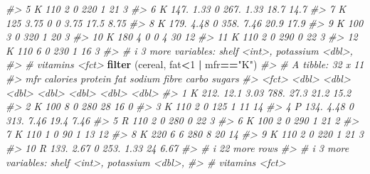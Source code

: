 \documentclass[
]{book}
\newenvironment{Shaded}{\begin{snugshade}}{\end{snugshade}}
\newcommand{\CommentTok}[1]{\textcolor[rgb]{0.56,0.35,0.01}{\textit{#1}}}
\newcommand{\DecValTok}[1]{\textcolor[rgb]{0.00,0.00,0.81}{#1}}
\newcommand{\FunctionTok}[1]{\textcolor[rgb]{0.13,0.29,0.53}{\textbf{#1}}}
\newcommand{\NormalTok}[1]{#1}
\newcommand{\SpecialCharTok}[1]{\textcolor[rgb]{0.81,0.36,0.00}{\textbf{#1}}}
\newcommand{\StringTok}[1]{\textcolor[rgb]{0.31,0.60,0.02}{#1}}
\begin{document}
\begin{Shaded}
\begin{Highlighting}[]
\CommentTok{\#\textgreater{}  5 K         110     2        0   220   1     21     3   }
\CommentTok{\#\textgreater{}  6 K         147.    1.33     0   267.  1.33  18.7  14.7 }
\CommentTok{\#\textgreater{}  7 K         125     3.75     0     0   3.75  17.5   8.75}
\CommentTok{\#\textgreater{}  8 K         179.    4.48     0   358.  7.46  20.9  17.9 }
\CommentTok{\#\textgreater{}  9 K         100     3        0   320   1     20     3   }
\CommentTok{\#\textgreater{} 10 K         180     4        0     0   4     30    12   }
\CommentTok{\#\textgreater{} 11 K         110     2        0   290   0     22     3   }
\CommentTok{\#\textgreater{} 12 K         110     6        0   230   1     16     3   }
\CommentTok{\#\textgreater{} \# i 3 more variables: shelf \textless{}int\textgreater{}, potassium \textless{}dbl\textgreater{},}
\CommentTok{\#\textgreater{} \#   vitamins \textless{}fct\textgreater{}}
\FunctionTok{filter}\NormalTok{ (cereal, fat}\SpecialCharTok{\textless{}}\DecValTok{1} \SpecialCharTok{|}\NormalTok{ mfr}\SpecialCharTok{==}\StringTok{"K"}\NormalTok{)}
\CommentTok{\#\textgreater{} \# A tibble: 32 x 11}
\CommentTok{\#\textgreater{}    mfr   calories protein   fat sodium fibre carbo sugars}
\CommentTok{\#\textgreater{}    \textless{}fct\textgreater{}    \textless{}dbl\textgreater{}   \textless{}dbl\textgreater{} \textless{}dbl\textgreater{}  \textless{}dbl\textgreater{} \textless{}dbl\textgreater{} \textless{}dbl\textgreater{}  \textless{}dbl\textgreater{}}
\CommentTok{\#\textgreater{}  1 K         212.   12.1   3.03   788. 27.3   21.2  15.2 }
\CommentTok{\#\textgreater{}  2 K         100     8     0      280  28     16     0   }
\CommentTok{\#\textgreater{}  3 K         110     2     0      125   1     11    14   }
\CommentTok{\#\textgreater{}  4 P         134.    4.48  0      313.  7.46  19.4   7.46}
\CommentTok{\#\textgreater{}  5 R         110     2     0      280   0     22     3   }
\CommentTok{\#\textgreater{}  6 K         100     2     0      290   1     21     2   }
\CommentTok{\#\textgreater{}  7 K         110     1     0       90   1     13    12   }
\CommentTok{\#\textgreater{}  8 K         220     6     6      280   8     20    14   }
\CommentTok{\#\textgreater{}  9 K         110     2     0      220   1     21     3   }
\CommentTok{\#\textgreater{} 10 R         133.    2.67  0      253.  1.33  24     6.67}
\CommentTok{\#\textgreater{} \# i 22 more rows}
\CommentTok{\#\textgreater{} \# i 3 more variables: shelf \textless{}int\textgreater{}, potassium \textless{}dbl\textgreater{},}
\CommentTok{\#\textgreater{} \#   vitamins \textless{}fct\textgreater{}}

\end{Highlighting}
\end{Shaded}
\end{document}
